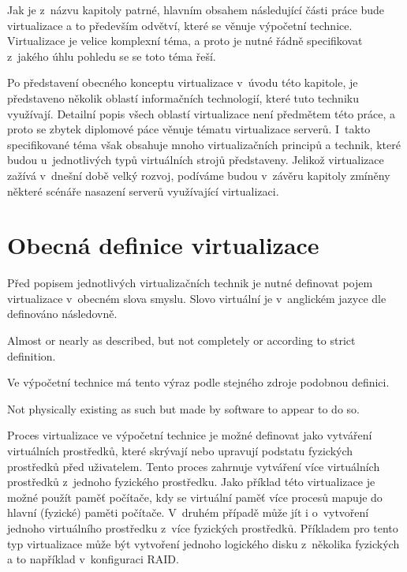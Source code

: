 \label{chapter:virtualization}
Jak je z~názvu kapitoly patrné, hlavním obsahem následující části práce bude virtualizace a to především odvětví, které se
věnuje výpočetní technice. Virtualizace je velice komplexní téma, a proto je nutné řádně specifikovat z~jakého úhlu pohledu
se se toto téma řeší.

Po představení obecného konceptu virtualizace v~úvodu této kapitole, je představeno několik oblastí informačních technologií,
které tuto techniku využívají. Detailní popis všech oblastí virtualizace není předmětem této práce, a proto se zbytek diplomové
páce věnuje tématu virtualizace serverů. I~takto specifikované téma však obsahuje mnoho virtualizačních principů a technik,
které budou u~jednotlivých typů virtuálních strojů představeny. Jelikož virtualizace zažívá v~dnešní době velký rozvoj, podíváme
budou v~závěru kapitoly zmíněny některé scénáře nasazení serverů využívající virtualizaci.
\section{Obecná definice virtualizace}
\label{chapter:virtualization:definition}
Před popisem jednotlivých virtualizačních technik je nutné definovat pojem virtualizace v~obecném slova smyslu. Slovo virtuální
je v~anglickém jazyce dle \cite{oxford:dictionary:virtual} definováno následovně.
\begin{definition}[Virtual]
  \label{definition:virtual}
  Almost or nearly as described, but not completely or according to strict definition.
\end{definition}

Ve výpočetní technice má tento výraz podle stejného zdroje \cite{oxford:dictionary:virtual} podobnou definici.
\begin{definition}
  \label{definition:virtual_computing}
  Not physically existing as such but made by software to appear to do so.
\end{definition}

Proces virtualizace ve výpočetní technice je možné definovat jako vytváření virtuálních prostředků, které skrývají nebo upravují
podstatu fyzických prostředků před uživatelem. Tento proces zahrnuje vytváření více virtuálních prostředků z~jednoho fyzického prostředku.
Jako příklad této virtualizace je možné použít paměť počítače, kdy se virtuální paměť více procesů mapuje do hlavní (fyzické)
paměti počítače. V~druhém případě může jít i o~vytvoření jednoho virtuálního prostředku z~více fyzických prostředků. Příkladem
pro tento typ virtualizace může být vytvoření jednoho logického disku z~několika fyzických a to například v~konfiguraci RAID. 


